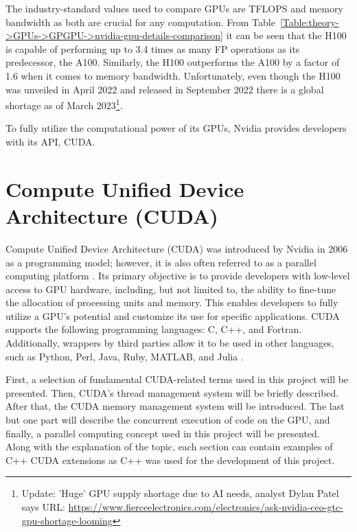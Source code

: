 The industry-standard values used to compare GPUs are TFLOPS and memory bandwidth as both are crucial for any computation.
From Table~\ref{Table:theory->GPUs->GPGPU->nvidia-gpu-details-comparison} it can be seen that the H100 is capable of performing up to 3.4 times as many FP operations as its predecessor, the A100.
Similarly, the H100 outperforms the A100 by a factor of 1.6 when it comes to memory bandwidth.
Unfortunately, even though the H100 was unveiled in April 2022 and released in September 2022 there is a global shortage as of March 2023\footnote{Update: 'Huge' GPU supply shortage due to AI needs, analyst Dylan Patel says URL: \url{https://www.fierceelectronics.com/electronics/ask-nvidia-ceo-gtc-gpu-shortage-looming}}.

To fully utilize the computational power of its GPUs, Nvidia provides developers with its API, CUDA.



\section{Compute Unified Device Architecture (CUDA)}\label{Section:theory->CUDA}

Compute Unified Device Architecture (CUDA) was introduced by Nvidia in 2006 as a programming model; however, it is also often referred to as a parallel computing platform \cite{Oh10September2012}.
Its primary objective is to provide developers with low-level access to GPU hardware, including, but not limited to, the ability to fine-tune the allocation of processing units and memory.
This enables developers to fully utilize a GPU's potential and customize its use for specific applications.
CUDA supports the following programming languages: C, C++, and Fortran.
Additionally, wrappers by third parties allow it to be used in other languages, such as Python, Perl, Java, Ruby, MATLAB, and Julia \cite{OsGyRFLMngy0j8Pv}.

First, a selection of fundamental CUDA-related terms used in this project will be presented.
Then, CUDA's thread management system will be briefly described.
After that, the CUDA memory management system will be introduced.
The last but one part will describe the concurrent execution of code on the GPU, and finally, a parallel computing concept used in this project will be presented.\\
Along with the explanation of the topic, each section can contain examples of C++ CUDA extensions as C++ was used for the development of this project.

